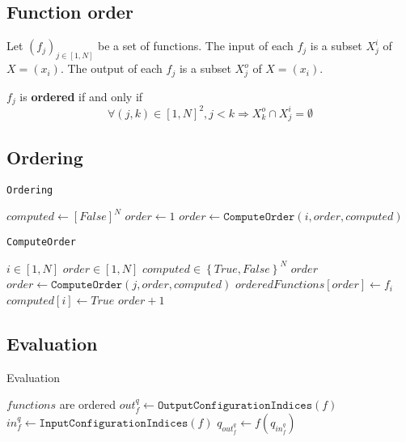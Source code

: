\documentclass {article}
\begin{document}
\subsection{Function order}

Let $(f_j)_{j\in [1,N]}$ be a set of functions.
The input of each $f_j$ is a subset $X^i_j$ of $X = (x_i)$.
The output of each $f_j$ is a subset $X^o_j$ of $X = (x_i)$.

$f_j$ is \textbf{ordered} if and only if
$$ \forall (j,k) \in [1,N]^2, j < k \Rightarrow X^o_k \cap X^i_j = \emptyset $$

\subsection{Ordering}

\begin{algorithm}
  \caption{\texttt{Ordering}}
  \begin{algorithmic}
    \STATE $ computed \gets \left[False\right]^N $
    \STATE $ order \gets 1 $
      \STATE $ order \gets \texttt{ComputeOrder}(i, order, computed)$
    \ENDFOR
  \end{algorithmic}
\end{algorithm}

\begin{algorithm}
  \caption{\texttt{ComputeOrder}}
  \begin{algorithmic}
    \REQUIRE $ i \in [1,N] $
    \REQUIRE $ order \in [1,N] $
    \REQUIRE $ computed \in \left\{True,False\right\}^N $
      \RETURN $order$
    \ENDIF
          \STATE $ order \gets \texttt{ComputeOrder}(j, order, computed)$
        \ENDIF
      \ENDFOR
      \STATE $ orderedFunctions[order] \gets f_i $
    \ENDFOR
    \STATE $computed[i] \gets True$
    \RETURN $order + 1$
  \end{algorithmic}
\end{algorithm}

\subsection{Evaluation}

\begin{algorithm}
  \caption{Evaluation}
  \begin{algorithmic}
    \REQUIRE $ functions $ are ordered
      \STATE $ out^q_f \gets \texttt{OutputConfigurationIndices}(f)$
      \STATE $ in^q_f  \gets \texttt{InputConfigurationIndices}(f)$
      \STATE $ q_{out^q_f} \gets f (q_{in^q_f}) $
    \ENDFOR
  \end{algorithmic}
\end{algorithm}
\end{document}
